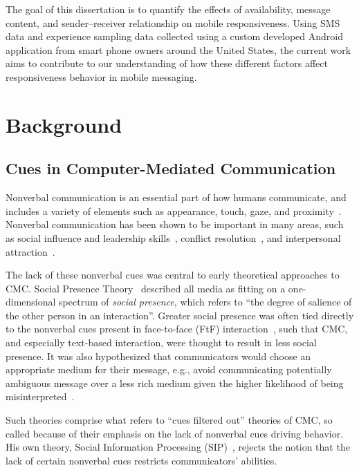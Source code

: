 \documentclass[12pt]{nuthesis}	%
\begin{document}
The goal of this dissertation is to quantify the effects of availability, message content, and sender--receiver relationship on mobile responsiveness. Using SMS data and experience sampling data collected using a custom developed Android application from smart phone owners around the United States, the current work aims to contribute to our understanding of how these different factors affect responsiveness behavior in mobile messaging.

\chapter{Background}

\section{Cues in Computer-Mediated Communication}

Nonverbal communication is an essential part of how humans communicate, and includes a variety of elements such as appearance, touch, gaze, and proximity~\citep{burgoon2016nonverbal}. Nonverbal communication has been shown to be important in many areas, such as social influence and leadership skills~\citep{hogg2006social}, conflict resolution~\citep{ting2001managing}, and interpersonal attraction~\citep{burgoon1991relational,erceau2007tactile}.

The lack of these nonverbal cues was central to early theoretical approaches to CMC. Social Presence Theory~\citep{short1976social} described all media as fitting on a one-dimensional spectrum of \textit{social presence}, which refers to ``the degree of salience of the other person in an interaction''. Greater social presence was often tied directly to the nonverbal cues present in face-to-face (FtF) interaction~\citep[e.g.,][]{burgoon1984relational}, such that CMC, and especially text-based interaction, were thought to result in less social presence. It was also hypothesized that communicators would choose an appropriate medium for their message, e.g., avoid communicating potentially ambiguous message over a less rich medium given the higher likelihood of being misinterpreted~\citep{daft1986organizational}.

Such theories comprise what \citet{walther2002cues} refers to ``cues filtered out'' theories of CMC, so called because of their emphasis on the lack of nonverbal cues driving behavior. His own theory, Social Information Processing (SIP)~\citep{walther1992interpersonal}, rejects the notion that the lack of certain nonverbal cues restricts communicators' abilities. 
\end{document}
